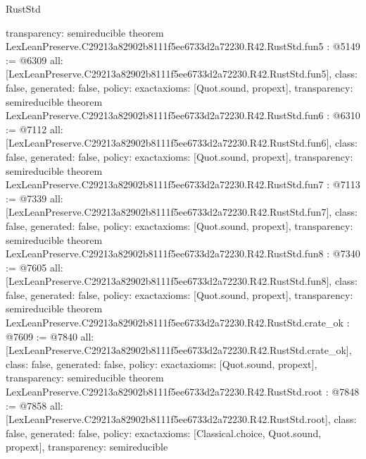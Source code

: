 \begin{lexlean}{RustStd}
\begin{coremodule}
{  transparency: semireducible
}
theorem LexLeanPreserve.C29213a82902b8111f5ee6733d2a72230.R42.RustStd.fun5 : @5149 := @6309 {
  all: [LexLeanPreserve.C29213a82902b8111f5ee6733d2a72230.R42.RustStd.fun5],
  class: false,
  generated: false,
  policy: exact{axioms: [Quot.sound, propext]},
  transparency: semireducible
}
theorem LexLeanPreserve.C29213a82902b8111f5ee6733d2a72230.R42.RustStd.fun6 : @6310 := @7112 {
  all: [LexLeanPreserve.C29213a82902b8111f5ee6733d2a72230.R42.RustStd.fun6],
  class: false,
  generated: false,
  policy: exact{axioms: [Quot.sound, propext]},
  transparency: semireducible
}
theorem LexLeanPreserve.C29213a82902b8111f5ee6733d2a72230.R42.RustStd.fun7 : @7113 := @7339 {
  all: [LexLeanPreserve.C29213a82902b8111f5ee6733d2a72230.R42.RustStd.fun7],
  class: false,
  generated: false,
  policy: exact{axioms: [Quot.sound, propext]},
  transparency: semireducible
}
theorem LexLeanPreserve.C29213a82902b8111f5ee6733d2a72230.R42.RustStd.fun8 : @7340 := @7605 {
  all: [LexLeanPreserve.C29213a82902b8111f5ee6733d2a72230.R42.RustStd.fun8],
  class: false,
  generated: false,
  policy: exact{axioms: [Quot.sound, propext]},
  transparency: semireducible
}
theorem LexLeanPreserve.C29213a82902b8111f5ee6733d2a72230.R42.RustStd.crate_ok : @7609 := @7840 {
  all: [LexLeanPreserve.C29213a82902b8111f5ee6733d2a72230.R42.RustStd.crate_ok],
  class: false,
  generated: false,
  policy: exact{axioms: [Quot.sound, propext]},
  transparency: semireducible
}
theorem LexLeanPreserve.C29213a82902b8111f5ee6733d2a72230.R42.RustStd.root : @7848 := @7858 {
  all: [LexLeanPreserve.C29213a82902b8111f5ee6733d2a72230.R42.RustStd.root],
  class: false,
  generated: false,
  policy: exact{axioms: [Classical.choice, Quot.sound, propext]},
  transparency: semireducible
}


\end{coremodule}
\end{lexlean}

